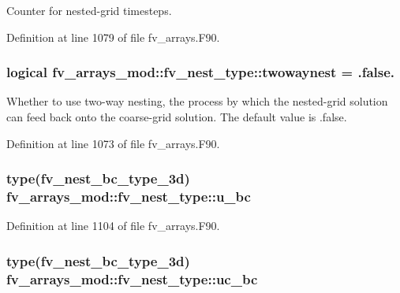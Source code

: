 Counter for nested-\/grid timesteps. 



Definition at line 1079 of file fv\-\_\-arrays.\-F90.

\subsubsection[{twowaynest}]{\setlength{\rightskip}{0pt plus 5cm}logical fv\-\_\-arrays\-\_\-mod\-::fv\-\_\-nest\-\_\-type\-::twowaynest = .false.}\label{structfv__arrays__mod_1_1fv__nest__type_a234513f19d64ac85cc358d3772d56a76}


Whether to use two-\/way nesting, the process by which the nested-\/grid solution can feed back onto the coarse-\/grid solution. The default value is .false. 



Definition at line 1073 of file fv\-\_\-arrays.\-F90.

\subsubsection[{u\-\_\-bc}]{\setlength{\rightskip}{0pt plus 5cm}type({\bf fv\-\_\-nest\-\_\-bc\-\_\-type\-\_\-3d}) fv\-\_\-arrays\-\_\-mod\-::fv\-\_\-nest\-\_\-type\-::u\-\_\-bc}\label{structfv__arrays__mod_1_1fv__nest__type_a6ab27401f6878ac25e0ae135a0421591}


Definition at line 1104 of file fv\-\_\-arrays.\-F90.

\subsubsection[{uc\-\_\-bc}]{\setlength{\rightskip}{0pt plus 5cm}type({\bf fv\-\_\-nest\-\_\-bc\-\_\-type\-\_\-3d}) fv\-\_\-arrays\-\_\-mod\-::fv\-\_\-nest\-\_\-type\-::uc\-\_\-bc}\label{structfv__arrays__mod_1_1fv__nest__type_a788322ff21e9cd4ae87c5d5dc0fbb559}


